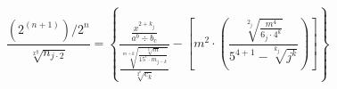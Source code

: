 \documentclass[11pt,a4paper]{article}
\begin{document}
$$\frac{\left(2^{(n+1)}\right)/2^n}{\sqrt[x^y]{n_{j\cdot2}}}=
\left\lbrace \frac{\frac{x^{2+k_j}}{a^b \div b_c}}
{\frac{\sqrt[m\div k]{\frac{\sqrt[3]{m}}{15^c \cdot m_{j-k}}}}{\sqrt[2^k]{c_k}}} - 
\left[m^2\cdot\left(\frac{\sqrt[2_j]{\frac{m^4}{6_j \cdot 4^k}}}{5^{4+1} - \sqrt[k_j]{j^k}}\right)\right]\right\rbrace$$
\end{document}
